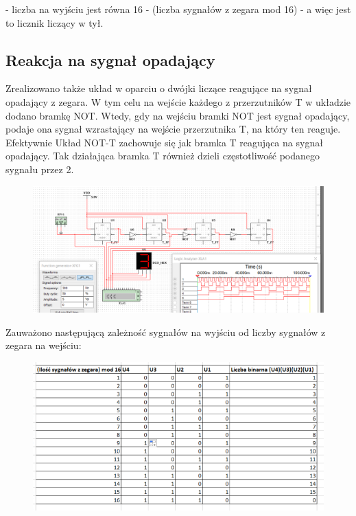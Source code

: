 \documentclass[12pt,a4paper]{article}
\begin{document}
- liczba na wyjściu jest równa 16 - (liczba sygnałów z zegara mod 16) - a więc jest to licznik liczący w tył.
\par
\par 

\subsection{Reakcja na sygnał opadający}
Zrealizowano także układ w oparciu o dwójki liczące reagujące na sygnał opadający z zegara. W tym celu na wejście każdego z przerzutników T w układzie dodano bramkę NOT. 
Wtedy, gdy na wejściu bramki NOT jest sygnał opadający, podaje ona sygnał wzrastający na wejście przerzutnika T, na który ten reaguje. Efektywnie Układ NOT-T zachowuje się jak bramka T reagująca na sygnał opadający. Tak działająca bramka T również dzieli częstotliwość podanego sygnału przez 2.


\begin{figure}[H]
\centering
\includegraphics[width=\textwidth]{img/4b_opad}
\end{figure}

Zauważono następującą zależność sygnałów na wyjściu od liczby sygnałów z zegara na wejściu:
\begin{figure}[H]
\centering
\includegraphics[width=\textwidth]{img/4b_opad_table}
\end{figure}
\end{document}
